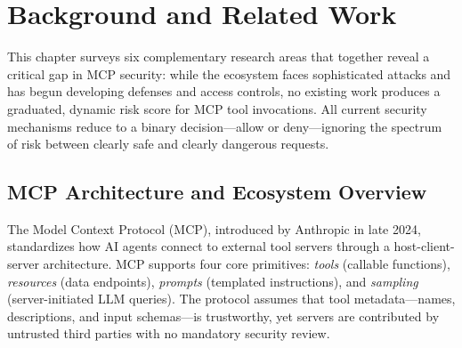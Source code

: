 \documentclass[12pt]{article}
\begin{document}
\begin{abstract}
The Model Context Protocol (MCP) enables AI agents to connect to third-party tool servers, creating a rapidly growing ecosystem of over 67{,}000 servers across six public registries. Current MCP security mechanisms rely on binary allow/deny decisions that treat all tool invocations identically, regardless of the actual risk posed by a specific request in a specific operational context. This work proposes a dynamic risk scoring framework for MCP agent access that produces a graduated 1--10 severity score for each tool invocation request, inspired by the CVSS vulnerability scoring methodology. We survey the MCP security landscape including attack taxonomies, tool poisoning techniques, defense frameworks, and access control mechanisms, and identify the absence of graduated, context-aware risk quantification as a critical gap. Building on evidence that LLMs can score vulnerability descriptions and that multi-signal aggregation improves detection over single-signal approaches, we outline a multi-stage scoring pipeline that combines static tool metadata analysis, contextual enrichment from session behavior and ecosystem baselines, and LLM-based risk judgment. The proposed system aims to enable nuanced security decisions---auto-allow, log, escalate, or auto-deny---based on quantified risk rather than binary classification.
\end{abstract}
\section{Background and Related Work}

This chapter surveys six complementary research areas that together reveal a critical gap in MCP security: while the ecosystem faces sophisticated attacks and has begun developing defenses and access controls, no existing work produces a graduated, dynamic risk score for MCP tool invocations. All current security mechanisms reduce to a binary decision---allow or deny---ignoring the spectrum of risk between clearly safe and clearly dangerous requests.

\subsection{MCP Architecture and Ecosystem Overview}

The Model Context Protocol (MCP), introduced by Anthropic in late 2024, standardizes how AI agents connect to external tool servers through a host-client-server architecture. MCP supports four core primitives: \emph{tools} (callable functions), \emph{resources} (data endpoints), \emph{prompts} (templated instructions), and \emph{sampling} (server-initiated LLM queries). The protocol assumes that tool metadata---names, descriptions, and input schemas---is trustworthy, yet servers are contributed by untrusted third parties with no mandatory security review.
\end{document}
